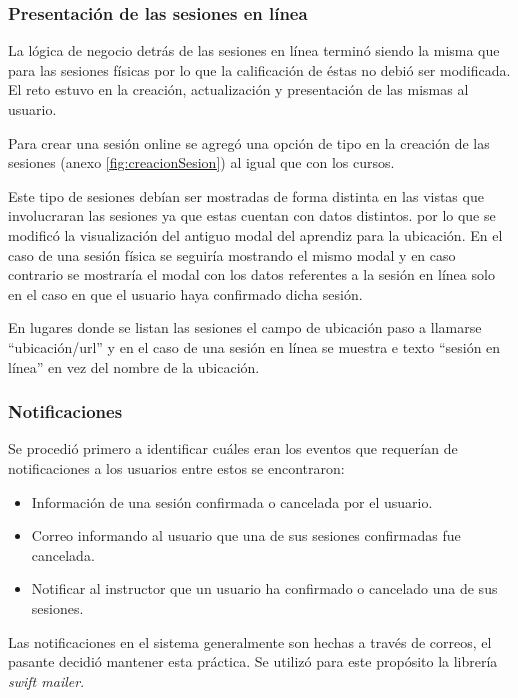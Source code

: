 \subsubsection{Presentación de las sesiones en línea }

La lógica de negocio detrás de las sesiones en línea terminó siendo la misma que para las sesiones físicas por lo que la calificación de éstas no debió ser modificada. El reto estuvo en la creación, actualización y presentación de las mismas al usuario.

Para crear una sesión online se agregó una opción de tipo en la creación de las sesiones (anexo \ref{fig:creacionSesion}) al igual que con los cursos.

Este tipo de sesiones debían ser mostradas de forma distinta en las vistas que involucraran las sesiones ya que estas cuentan con datos distintos. por lo que se modificó la visualización del antiguo modal del aprendiz para la ubicación. En el caso de una sesión física se seguiría mostrando el mismo modal y en caso contrario se mostraría el modal con los datos referentes a la sesión en línea solo en el caso en que el usuario haya confirmado dicha sesión.

En lugares donde se listan las sesiones el campo de ubicación paso a llamarse ``ubicación/url'' y en el caso de una sesión en línea se muestra e texto ``sesión en línea'' en vez del nombre de la ubicación. 

\subsubsection{Notificaciones}

Se procedió primero a identificar cuáles eran los eventos que requerían de notificaciones a los usuarios entre estos se encontraron:

\begin{itemize}
	\item Información de una sesión confirmada o cancelada por el usuario.
	\item Correo informando al usuario que una de sus sesiones confirmadas fue cancelada.
	\item Notificar al instructor que un usuario ha confirmado o cancelado una de sus sesiones.
\end{itemize}

Las notificaciones en el sistema generalmente son hechas a través de correos, el pasante decidió mantener esta práctica. Se utilizó para este propósito la librería \emph{swift mailer}.

